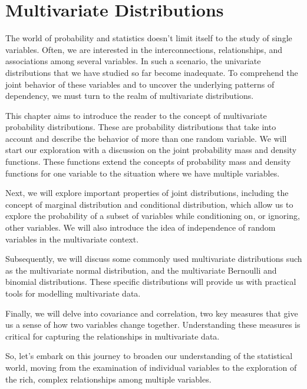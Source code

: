 \chapter{Multivariate Distributions}

The world of probability and statistics doesn't limit itself to the study of single variables. Often, we are interested in the interconnections, relationships, and associations among several variables. In such a scenario, the univariate distributions that we have studied so far become inadequate. To comprehend the joint behavior of these variables and to uncover the underlying patterns of dependency, we must turn to the realm of multivariate distributions. 

This chapter aims to introduce the reader to the concept of multivariate probability distributions. These are probability distributions that take into account and describe the behavior of more than one random variable. We will start our exploration with a discussion on the joint probability mass and density functions. These functions extend the concepts of probability mass and density functions for one variable to the situation where we have multiple variables. 

Next, we will explore important properties of joint distributions, including the concept of marginal distribution and conditional distribution, which allow us to explore the probability of a subset of variables while conditioning on, or ignoring, other variables. We will also introduce the idea of independence of random variables in the multivariate context.

Subsequently, we will discuss some commonly used multivariate distributions such as the multivariate normal distribution, and the multivariate Bernoulli and binomial distributions. These specific distributions will provide us with practical tools for modelling multivariate data.

Finally, we will delve into covariance and correlation, two key measures that give us a sense of how two variables change together. Understanding these measures is critical for capturing the relationships in multivariate data.

So, let's embark on this journey to broaden our understanding of the statistical world, moving from the examination of individual variables to the exploration of the rich, complex relationships among multiple variables.


